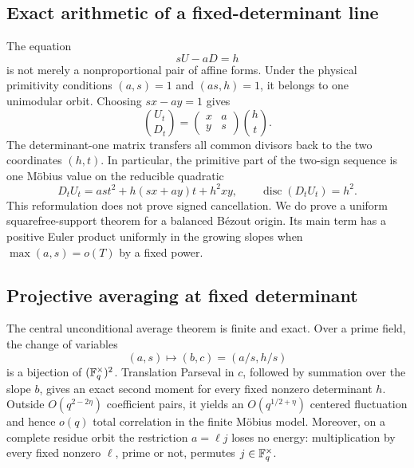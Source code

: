 \subsection{Exact arithmetic of a fixed-determinant line}

The equation
\begin{equation}
 sU-aD=h
 \label{eq:tpc33-intro-determinant-line}
\end{equation}
is not merely a nonproportional pair of affine forms.  Under the physical
primitivity conditions \((a,s)=1\) and \((as,h)=1\), it belongs to one
unimodular orbit.  Choosing \(sx-ay=1\) gives
\[
 \binom{U_t}{D_t}
 =\begin{pmatrix}x&a\\y&s\end{pmatrix}
  \binom{h}{t}.
\]
The determinant-one matrix transfers all common divisors back to the two
coordinates \((h,t)\).  In particular, the primitive part of the two-sign
sequence is one M\"obius value on the reducible quadratic
\begin{equation}
 D_tU_t
 =as t^2+h(sx+ay)t+h^2xy,
 \qquad
 \operatorname{disc}(D_tU_t)=h^2.
 \label{eq:tpc33-intro-quadratic}
\end{equation}
This reformulation does not prove signed cancellation.  We do prove a
uniform squarefree-support theorem for a balanced B\'ezout origin.  Its
main term has a positive Euler product uniformly in the growing slopes
when \(\max(a,s)=o(T)\) by a fixed power.

\subsection{Projective averaging at fixed determinant}

The central unconditional average theorem is finite and exact.  Over a
prime field, the change of variables
\begin{equation}
 (a,s)\longmapsto(b,c)=(a/s,h/s)
 \label{eq:tpc33-intro-projective-change}
\end{equation}
is a bijection of \((\mathbb F_q^\times)^2\).  Translation Parseval in \(c\),
followed by summation over the slope \(b\), gives an exact second moment for
every fixed nonzero determinant \(h\).  Outside \(O(q^{2-2\eta})\)
coefficient pairs, it yields an \(O(q^{1/2+\eta})\) centered fluctuation and
hence \(o(q)\) total correlation in the finite M\"obius model.
Moreover, on a complete residue orbit the restriction \(a=\ell j\) loses
no energy: multiplication by every fixed nonzero \(\ell\), prime or not,
permutes \(j\in\mathbb F_q^\times\).

